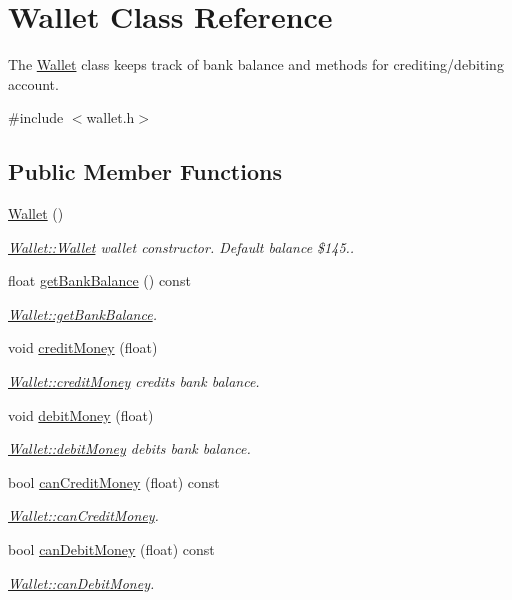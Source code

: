 \hypertarget{classWallet}{}\section{Wallet Class Reference}
\label{classWallet}


The \hyperlink{classWallet}{Wallet} class keeps track of bank balance and methods for crediting/debiting account.  




{\ttfamily \#include $<$wallet.\+h$>$}

\subsection*{Public Member Functions}
\begin{DoxyCompactItemize}
\item 
\hyperlink{classWallet_ad9be9e49244b78db9099fcaeccd1af04}{Wallet} ()
\begin{DoxyCompactList}\small\item\em \hyperlink{classWallet_ad9be9e49244b78db9099fcaeccd1af04}{Wallet\+::\+Wallet} wallet constructor. Default balance \$145.. \end{DoxyCompactList}\item 
float \hyperlink{classWallet_a92536035a1de76dc7842693beb93cd24}{get\+Bank\+Balance} () const
\begin{DoxyCompactList}\small\item\em \hyperlink{classWallet_a92536035a1de76dc7842693beb93cd24}{Wallet\+::get\+Bank\+Balance}. \end{DoxyCompactList}\item 
void \hyperlink{classWallet_ab9354b0a8250c0f21b867cc725a33e1e}{credit\+Money} (float)
\begin{DoxyCompactList}\small\item\em \hyperlink{classWallet_ab9354b0a8250c0f21b867cc725a33e1e}{Wallet\+::credit\+Money} credits bank balance. \end{DoxyCompactList}\item 
void \hyperlink{classWallet_a8be722d227a610e4b36b79c2eb04c73f}{debit\+Money} (float)
\begin{DoxyCompactList}\small\item\em \hyperlink{classWallet_a8be722d227a610e4b36b79c2eb04c73f}{Wallet\+::debit\+Money} debits bank balance. \end{DoxyCompactList}\item 
bool \hyperlink{classWallet_a69b488bc31201592bb860b6fdaafa1b8}{can\+Credit\+Money} (float) const
\begin{DoxyCompactList}\small\item\em \hyperlink{classWallet_a69b488bc31201592bb860b6fdaafa1b8}{Wallet\+::can\+Credit\+Money}. \end{DoxyCompactList}\item 
bool \hyperlink{classWallet_a1583a38c87dd04ecd5854f15590e170d}{can\+Debit\+Money} (float) const
\begin{DoxyCompactList}\small\item\em \hyperlink{classWallet_a1583a38c87dd04ecd5854f15590e170d}{Wallet\+::can\+Debit\+Money}. \end{DoxyCompactList}\end{DoxyCompactItemize}

